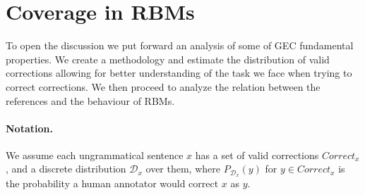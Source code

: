 \documentclass[a4paper, 11pt]{article}
\begin{document}
%
%
%
%
%
%
%

\vspace{-.1cm}
\section{Coverage in RBMs}\label{sec:increase-reference}
\vspace{-.1cm}
To open the discussion we put forward an analysis of some of GEC fundamental properties. We create a methodology and estimate the distribution of valid corrections allowing for better understanding of the task we face when trying to correct corrections. We then proceed to analyze the relation between the references and the behaviour of RBMs.

\vspace{-.1cm}
\paragraph{Notation.}
We assume each ungrammatical sentence $x$ has a set of valid corrections $Correct_x$,
and a discrete distribution $\mathcal{D}_x$ over them, where $P_{\mathcal{D}_x}(y)$
for $y \in Correct_x$ is the probability a human annotator would correct $x$ as $y$.
\end{document}
